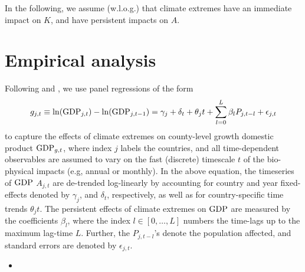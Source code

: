 \documentclass[preprint,3p,authoryear]{elsarticle}
\begin{document}
In the following, we assume (w.l.o.g.) that climate extremes have an immediate impact on $K$, and have persistent impacts on $A$.

\section{Empirical analysis}
\label{sec:empAna}
Following \citet{BAK19} and \citet{HSI14}, we use panel regressions of the form
\begin{equation}
  \label{eq:PRGDP}
  g_{j,t}\equiv \ln(\operatorname{GDP}_{j,t})-\ln(\operatorname{GDP}_{j,t-1}) = \gamma_j + \delta_{t} + \theta_j t + \sum_{l=0}^{L}\beta_{l}P_{j,t-l}+\epsilon_{j,t}
\end{equation}
to capture the effects of climate extremes on county-level growth domestic product $\operatorname{GDP}_{g,t}$, where index $j$ labels the countries, and all time-dependent observables are assumed to vary on the fast (discrete) timescale $t$ of the bio-physical impacts (e.g, annual or monthly).
In the above equation, the timeseries of $\operatorname{GDP}$ $A_{j,t}$ are de-trended log-linearly by accounting for country and year fixed-effects denoted by $\gamma_j$, and $\delta_t$, respectively, as well as for country-specific time trends $\theta_j t$. The persistent effects of climate extremes on $\operatorname{GDP}$ are measured by the coefficients $\beta_l$, where the index $l\in[0,\ldots,L]$ numbers the time-lags up to the maximum lag-time $L$. Further, the $P_{j,t-l}$'s denote the population affected, and standard errors are denoted by $\epsilon_{j,t}$.
\begin{itemize}
\item {}
\end{itemize}
\end{document}
